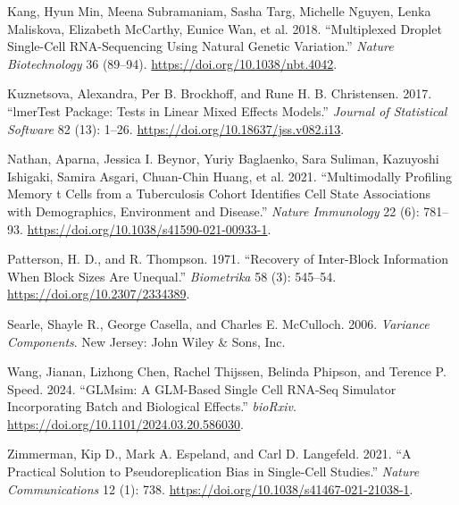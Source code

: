 \documentclass[
]{article}
\newlength{\cslhangindent}
\newlength{\cslentryspacingunit} %
\newenvironment{CSLReferences}[2] %
 {%
  \setlength{\parindent}{0pt}
  \ifodd #1
  \let\oldpar\par
  \def\par{\hangindent=\cslhangindent\oldpar}
  \fi
  \setlength{\parskip}{#2\cslentryspacingunit}
 }%
 {}
\begin{document}
\begin{CSLReferences}{1}{0}
\leavevmode{}%
Kang, Hyun Min, Meena Subramaniam, Sasha Targ, Michelle Nguyen, Lenka
Maliskova, Elizabeth McCarthy, Eunice Wan, et al. 2018. {``Multiplexed
Droplet Single-Cell RNA-Sequencing Using Natural Genetic Variation.''}
\emph{Nature Biotechnology} 36 (89--94).
\url{https://doi.org/10.1038/nbt.4042}.

\leavevmode{}%
Kuznetsova, Alexandra, Per B. Brockhoff, and Rune H. B. Christensen.
2017. {``{lmerTest} Package: Tests in Linear Mixed Effects Models.''}
\emph{Journal of Statistical Software} 82 (13): 1--26.
\url{https://doi.org/10.18637/jss.v082.i13}.

\leavevmode{}%
Nathan, Aparna, Jessica I. Beynor, Yuriy Baglaenko, Sara Suliman,
Kazuyoshi Ishigaki, Samira Asgari, Chuan-Chin Huang, et al. 2021.
{``Multimodally Profiling Memory t Cells from a Tuberculosis Cohort
Identifies Cell State Associations with Demographics, Environment and
Disease.''} \emph{Nature Immunology} 22 (6): 781--93.
\url{https://doi.org/10.1038/s41590-021-00933-1}.

\leavevmode{}%
Patterson, H. D., and R. Thompson. 1971. {``Recovery of Inter-Block
Information When Block Sizes Are Unequal.''} \emph{Biometrika} 58 (3):
545--54. \url{https://doi.org/10.2307/2334389}.

\leavevmode{}%
Searle, Shayle R., George Casella, and Charles E. McCulloch. 2006.
\emph{Variance Components}. New Jersey: John Wiley \& Sons, Inc.

\leavevmode{}%
Wang, Jianan, Lizhong Chen, Rachel Thijssen, Belinda Phipson, and
Terence P. Speed. 2024. {``GLMsim: A GLM-Based Single Cell RNA-Seq
Simulator Incorporating Batch and Biological Effects.''} \emph{bioRxiv}.
\url{https://doi.org/10.1101/2024.03.20.586030}.

\leavevmode{}%
Zimmerman, Kip D., Mark A. Espeland, and Carl D. Langefeld. 2021. {``A
Practical Solution to Pseudoreplication Bias in Single-Cell Studies.''}
\emph{Nature Communications} 12 (1): 738.
\url{https://doi.org/10.1038/s41467-021-21038-1}.

\end{CSLReferences}
\end{document}
